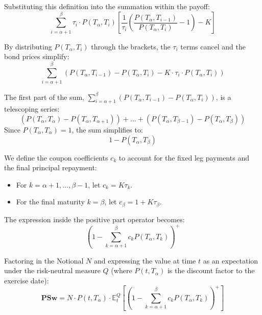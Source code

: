 \documentclass[12pt,a4paper]{exam}
\begin{document}
\begin{questions}
\begin{solution}
Substituting this definition into the summation within the payoff:
\begin{equation*}
	\sum_{i=\alpha+1}^\beta \tau_i \cdot P(T_\alpha, T_i) \left[ \frac{1}{\tau_i} \left( \frac{P(T_\alpha, T_{i-1})}{P(T_\alpha, T_i)} - 1 \right) - K \right]
\end{equation*}

By distributing $P(T_\alpha, T_i)$ through the brackets, the $\tau_i$ terms cancel and the bond prices simplify:
\begin{equation*}
	\sum_{i=\alpha+1}^\beta \left( P(T_\alpha, T_{i-1}) - P(T_\alpha, T_i) - K \cdot \tau_i \cdot P(T_\alpha, T_i) \right)
\end{equation*}

The first part of the sum, $\sum_{i=\alpha+1}^\beta (P(T_\alpha, T_{i-1}) - P(T_\alpha, T_i))$, is a telescoping series:
\begin{equation*}
	(P(T_\alpha, T_\alpha) - P(T_\alpha, T_{\alpha+1})) + \dots + (P(T_\alpha, T_{\beta-1}) - P(T_\alpha, T_\beta))
\end{equation*}
Since $P(T_\alpha, T_\alpha) = 1$, the sum simplifies to:
\begin{equation*}
	1 - P(T_\alpha, T_\beta)
\end{equation*}

We define the coupon coefficients $c_k$ to account for the fixed leg payments and the final principal repayment:
\begin{itemize}
	\item For $k = \alpha+1, \dots, \beta-1$, let $c_k = K \tau_k$.
	\item For the final maturity $k = \beta$, let $c_\beta = 1 + K \tau_\beta$.
\end{itemize}
The expression inside the positive part operator becomes:
\begin{equation*}
	\left( 1 - \sum_{k=\alpha+1}^\beta c_k P(T_\alpha, T_k) \right)^+
\end{equation*}

Factoring in the Notional $N$ and expressing the value at time $t$ as an expectation under the risk-neutral measure $Q$ (where $P(t, T_\alpha)$ is the discount factor to the exercise date):
\begin{equation*}
	\textbf{PSw} = N \cdot P(t, T_\alpha) \cdot \mathbb{E}^{Q}_t \left[ \left( 1 - \sum_{k=\alpha+1}^\beta c_k P(T_\alpha, T_k) \right)^+ \right]
\end{equation*}
\end{solution}


\end{questions}
\end{document}
